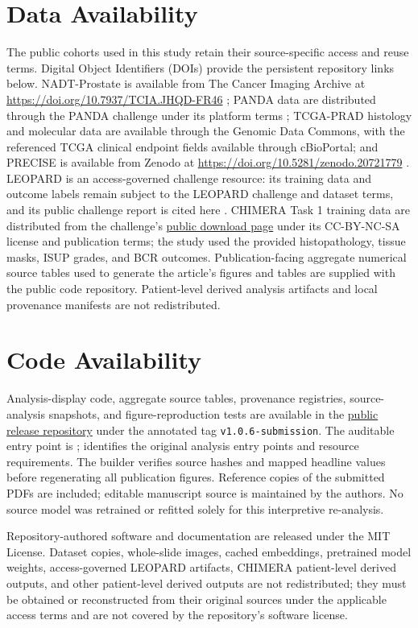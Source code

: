 \section*{Data Availability}

The public cohorts used in this study retain their source-specific access and reuse terms.
Digital Object Identifiers (DOIs) provide the persistent repository links below.
NADT-Prostate is available from The Cancer Imaging Archive at
\url{https://doi.org/10.7937/TCIA.JHQD-FR46} \cite{nadt2021}; PANDA data are distributed through the
PANDA challenge under its platform terms \cite{panda2022}; TCGA-PRAD histology and
molecular data are available through the Genomic Data Commons, with the referenced
TCGA clinical endpoint fields available through cBioPortal; and PRECISE is available from
Zenodo at \url{https://doi.org/10.5281/zenodo.20721779} \cite{precise2026}. LEOPARD is an
access-governed challenge resource: its training data and outcome labels remain subject to
the LEOPARD challenge and dataset terms, and its public challenge report is cited here
\cite{leopard2026}. CHIMERA Task 1 training data are distributed from the challenge's
\href{https://chimera.grand-challenge.org/dataset-download/}{public download page} under its
CC-BY-NC-SA license and publication terms; the study used the provided histopathology, tissue
masks, ISUP grades, and BCR outcomes. Publication-facing aggregate numerical source tables used to generate
the article's figures and tables are supplied with the public code repository. Patient-level
derived analysis artifacts and local provenance manifests are not redistributed.

\section*{Code Availability}

Analysis-display code, aggregate source tables, provenance registries, source-analysis snapshots,
and figure-reproduction tests are available in the
\href{https://github.com/AiXLab-GNU/evidence-qualified-alignment-prostate-cancer}{public release repository}
under the annotated tag \texttt{v1.0.6-submission}. The auditable entry point is
;  identifies the original analysis
entry points and resource requirements. The builder verifies source hashes and mapped headline
values before regenerating all publication figures. Reference copies of the submitted PDFs are
included; editable manuscript source is maintained by the authors. No source model was retrained
or refitted solely for this interpretive re-analysis.

Repository-authored software and documentation are released under the MIT License.
Dataset copies, whole-slide images, cached embeddings, pretrained model weights,
access-governed LEOPARD artifacts, CHIMERA patient-level derived outputs, and other patient-level
derived outputs are not redistributed;
they must be obtained or reconstructed from their original sources under the applicable
access terms and are not covered by the repository's software license.

